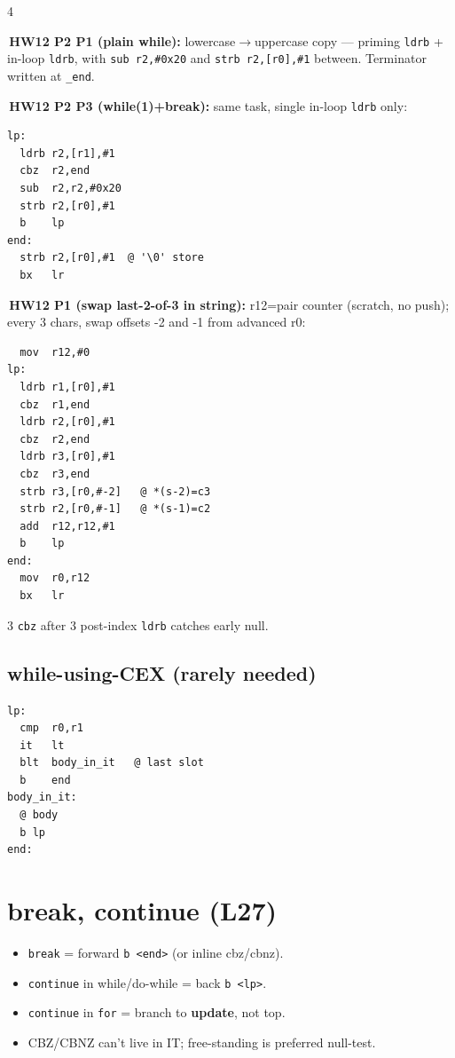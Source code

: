 \documentclass[8pt,landscape]{extarticle}
\newcommand{\asm}[1]{\texttt{\scriptsize #1}}
\newcommand{\cee}[1]{\texttt{\scriptsize #1}}
\newenvironment{ex}
  {\par\smallskip\noindent{\scriptsize\color{red!55!black}\textbf{Ex.}}\,\scriptsize\ignorespaces}
  {\par}
\begin{document}
\begin{multicols*}{4}
\begin{ex}\textbf{HW12 P2 P1 (plain while):} lowercase$\to$uppercase copy --- priming \asm{ldrb} + in-loop \asm{ldrb}, with \asm{sub r2,\#0x20} and \asm{strb r2,[r0],\#1} between. Terminator written at \texttt{\_end}.\end{ex}

\begin{ex}\textbf{HW12 P2 P3 (while(1)+break):} same task, single in-loop \asm{ldrb} only:
\begin{lstlisting}
lp:
  ldrb r2,[r1],#1
  cbz  r2,end
  sub  r2,r2,#0x20
  strb r2,[r0],#1
  b    lp
end:
  strb r2,[r0],#1  @ '\0' store
  bx   lr
\end{lstlisting}\end{ex}

\begin{ex}\textbf{HW12 P1 (swap last-2-of-3 in string):} r12=pair counter (scratch, no push); every 3 chars, swap offsets -2 and -1 from advanced r0:
\begin{lstlisting}
  mov  r12,#0
lp:
  ldrb r1,[r0],#1
  cbz  r1,end
  ldrb r2,[r0],#1
  cbz  r2,end
  ldrb r3,[r0],#1
  cbz  r3,end
  strb r3,[r0,#-2]   @ *(s-2)=c3
  strb r2,[r0,#-1]   @ *(s-1)=c2
  add  r12,r12,#1
  b    lp
end:
  mov  r0,r12
  bx   lr
\end{lstlisting}
3 \asm{cbz} after 3 post-index \asm{ldrb} catches early null.\end{ex}

\subsection{while-using-CEX (rarely needed)}
\begin{lstlisting}
lp:
  cmp  r0,r1
  it   lt
  blt  body_in_it   @ last slot
  b    end
body_in_it:
  @ body
  b lp
end:
\end{lstlisting}

\section{break, continue (L27)}
\begin{itemize}
\item \cee{break} = forward \asm{b <end>} (or inline cbz/cbnz).
\item \cee{continue} in while/do-while = back \asm{b <lp>}.
\item \cee{continue} in \texttt{for} = branch to \textbf{update}, not top.
\item CBZ/CBNZ can't live in IT; free-standing is preferred null-test.
\end{itemize}


\end{multicols*}
\end{document}

